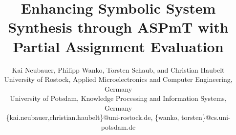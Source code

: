 \documentclass[conference]{IEEEtran}
\makeatletter
\newcommand{\specificthanks}[1]{\@fnsymbol{#1}}%
\makeatother
\begin{document}
%
\title{Enhancing Symbolic System Synthesis through ASPmT with Partial Assignment Evaluation}


\author{
	Kai Neubauer\textsuperscript{\specificthanks{1}}, Philipp Wanko\textsuperscript{\specificthanks{2}}, Torsten Schaub\textsuperscript{\specificthanks{2}}, and Christian Haubelt\textsuperscript{\specificthanks{1}}
	\\\small{\textsuperscript{\specificthanks{1}}University of Rostock, Applied Microelectronics and Computer Engineering, Germany}
	\\\small{\textsuperscript{\specificthanks{2}}University of Potsdam, Knowledge Processing and Information Systems, Germany}
	\\\footnotesize{\{kai.neubauer,christian.haubelt\}@uni-rostock.de}, \{wanko, torsten\}@cs.uni-potsdam.de%
}
\end{document}
